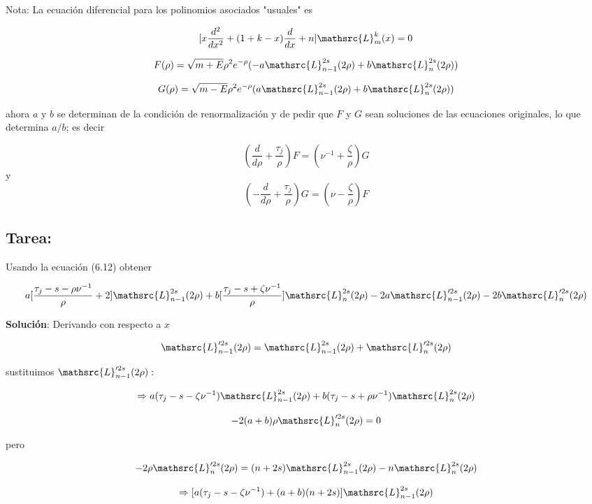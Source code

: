 \documentclass{report}
\begin{document}
Nota: La ecuación diferencial para los polinomios asociados "usuales" es

\[[x \frac{d^2 }{dx^2 } + (1 + k - x)\frac{d}{dx}+n] \mathsrc{L}_{m}^{k}(x)=0 \]

\[F(\rho ) = \sqrt{m + E} \rho ^2 e^{-\rho }(-a \mathsrc{L}_{n-1}^{2s}(2 \rho )+b\mathsrc{L}_{n}^{2s}(2 \rho ))\]

\[G(\rho ) = \sqrt{m - E} \rho ^2 e^{-\rho }(a \mathsrc{L}_{n-1}^{2s}(2 \rho )+b\mathsrc{L}_{n}^{2s}(2 \rho ))\]

ahora $a$ y $b$ se determinan de la condición de renormalización y de pedir que $F$ y $G$ sean soluciones de las ecuaciones originales, lo que determina $a/b$; es decir

\begin{equation}
(\frac{d}{d \rho } + \frac{\tau _{j}}{\rho})F = (\nu ^{-1} + \frac{\zeta}{\rho})G 
\end{equation}
y
\begin{equation}
(-\frac{d}{d \rho } + \frac{\tau _{j}}{\rho})G = (\nu - \frac{\zeta}{\rho})F
\end{equation}

\subsection{Tarea:} Usando la ecuación (6.12) obtener

\[a[\frac{\tau_j - s - \rho \nu ^{-1}}{\rho } + 2]\mathsrc{L}_{n-1}^{2s} (2 \rho ) + b [\frac{\tau _j - s + \zeta \nu ^{-1}}{\rho}]\mathsrc{L}_{n}^{2s}(2\rho )-2a \mathsrc{L}_{n-1}^{\prime 2s}(2 \rho )-2b \mathsrc{L}_{n}^{\prime 2s} (2 \rho) \]

\textbf{Solución}: Derivando con respecto a $x$

\[\mathsrc{L}_{n-1}^{\prime 2s} (2 \rho ) = \mathsrc{L}_{n-1}^{2s}(2 \rho )+\mathsrc{L}_{n}^{\prime 2s} (2 \rho)\]

sustituimos $\mathsrc{L}_{n-1}^{\prime 2s}(2 \rho ):$

\[\Rightarrow a (\tau_j - s - \zeta \nu ^{-1})\mathsrc{L}_{n-1}^{2s}(2 \rho ) + b(\tau_j - s + \rho \nu ^{-1}) \mathsrc{L}_{n}^{2s} (2 \rho )\]

\[-2(a+b)\rho \mathsrc{L}_{n}^{\prime 2s}(2 \rho ) = 0\]

pero

\[-2 \rho \mathsrc{L}_{n}^{\prime 2s}(2 \rho) = (n + 2s)\mathsrc{L}_{n-1}^{2s}(2 \rho )-n \mathsrc{L}_{n}^{2s} (2 \rho )\]

\[\Rightarrow [a(\tau_j - s - \zeta \nu ^{-1})+(a+b)(n+2s)]\mathsrc{L}_{n-1}^{2s}(2 \rho )\]
\end{document}
